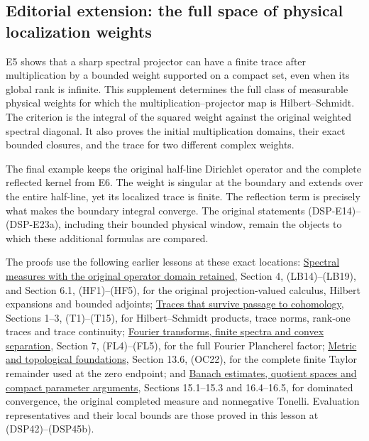 \documentclass[
  11pt,
]{article}
\begin{document}
\subsection{Editorial extension: the full space of physical localization
weights}\label{AN03-DSP-LOCALIZATION-EXTENSION}

E5 shows that a sharp spectral projector can have a finite trace after
multiplication by a bounded weight supported on a compact set, even when
its global rank is infinite. This supplement determines the full class
of measurable physical weights for which the multiplication--projector
map is Hilbert--Schmidt. The criterion is the integral of the squared
weight against the original weighted spectral diagonal. It also proves
the initial multiplication domains, their exact bounded closures, and
the trace for two different complex weights.

The final example keeps the original half-line Dirichlet operator and
the complete reflected kernel from E6. The weight is singular at the
boundary and extends over the entire half-line, yet its localized trace
is finite. The reflection term is precisely what makes the boundary
integral converge. The original statements (DSP-E14)--(DSP-E23a),
including their bounded physical window, remain the objects to which
these additional formulas are compared.

The proofs use the following earlier lessons at these exact locations:
\href{lower-bounded-spectral-calculus.pdf}{Spectral measures with the
original operator domain retained}, Section 4, (LB14)--(LB19), and
Section 6.1, (HF1)--(HF5), for the original projection-valued calculus,
Hilbert expansions and bounded adjoints;
\href{traces-and-complexes.pdf}{Traces that survive passage to
cohomology}, Sections 1--3, (T1)--(T15), for Hilbert--Schmidt products,
trace norms, rank-one traces and trace continuity;
\href{prerequisite-bridges.pdf}{Fourier transforms, finite spectra and
convex separation}, Section 7, (FL4)--(FL5), for the full Fourier
Plancherel factor; \href{metric-foundation-bridges.pdf}{Metric and
topological foundations}, Section 13.6, (OC22), for the complete finite
Taylor remainder used at the zero endpoint; and
\href{banach-foundation-bridges.pdf}{Banach estimates, quotient spaces
and compact parameter arguments}, Sections 15.1--15.3 and 16.4--16.5,
for dominated convergence, the original completed measure and
nonnegative Tonelli. Evaluation representatives and their local bounds
are those proved in this lesson at (DSP42)--(DSP45b).
\end{document}
